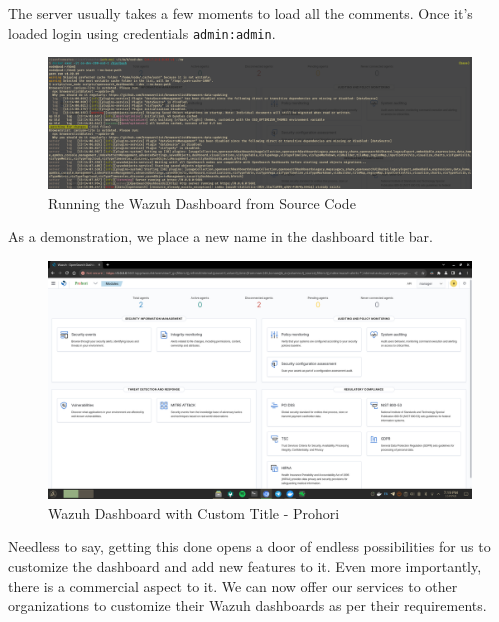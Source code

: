 The server usually takes a few moments to load all the comments. Once it's loaded login using credentials \texttt{admin:admin}.
    \begin{figure} [H]
        \centering
        \includegraphics[width=\textwidth]{images/run-prohori.png}
        \caption{Running the Wazuh Dashboard from Source Code}
        \label{fig:run-prohori}
    \end{figure}
As a demonstration, we place a new name in the dashboard title bar.
    \begin{figure} [H]
        \centering
        \includegraphics[width=\textwidth]{images/prohori.png}
        \caption{Wazuh Dashboard with Custom Title - Prohori}
        \label{fig:prohori}
    \end{figure}
Needless to say, getting this done opens a door of endless possibilities for us to customize the dashboard and add new features to it. Even more importantly, there is a commercial aspect to it. We can now offer our services to other organizations to customize their Wazuh dashboards as per their requirements.